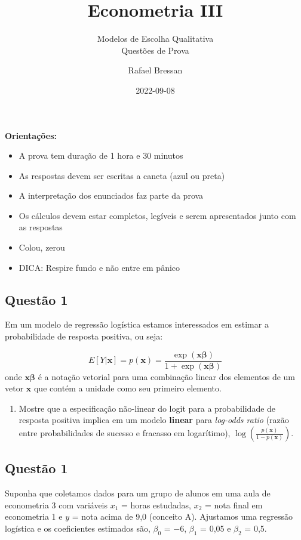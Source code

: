 \documentclass[
]{article}
\title{Econometria III}
\subtitle{Modelos de Escolha Qualitativa\\
Questões de Prova}
\author{Rafael Bressan}
\date{2022-09-08}
\providecommand{\tightlist}{%
  \setlength{\itemsep}{0pt}\setlength{\parskip}{0pt}}
\begin{document}
\maketitle

\textbf{Orientações:}

\begin{itemize}
\tightlist
\item
  A prova tem duração de 1 hora e 30 minutos
\item
  As respostas devem ser escritas a caneta (azul ou preta)
\item
  A interpretação dos enunciados faz parte da prova
\item
  Os cálculos devem estar completos, legíveis e serem apresentados junto
  com as respostas
\item
  Colou, zerou
\item
  DICA: Respire fundo e não entre em pânico
\end{itemize}

\hypertarget{questuxe3o-1}{%
\subsection{Questão 1}\label{questuxe3o-1}}

Em um modelo de regressão logística estamos interessados em estimar a
probabilidade de resposta positiva, ou seja:

\[E[Y|\symbf{x}]=p(\symbf{x})=\frac{\exp(\symbf{x\beta})}{1+\exp(\symbf{x\beta})}\]
onde \(\symbf{x\beta}\) é a notação vetorial para uma combinação linear
dos elementos de um vetor \(\symbf{x}\) que contém a unidade como seu
primeiro elemento.

\begin{enumerate}
\def\labelenumi{\alph{enumi})}
\tightlist
\item
  Mostre que a especificação não-linear do logit para a probabilidade de
  resposta positiva implica em um modelo \textbf{linear} para
  \emph{log-odds ratio} (razão entre probabilidades de sucesso e
  fracasso em logarítimo),
  \(\log\left(\frac{p(\symbf{x})}{1-p(\symbf{x})}\right)\).
\end{enumerate}

\hypertarget{questuxe3o-1-1}{%
\subsection{Questão 1}\label{questuxe3o-1-1}}

Suponha que coletamos dados para um grupo de alunos em uma aula de
econometria 3 com variáveis \(x_1\) = horas estudadas, \(x_2\) = nota
final em econometria 1 e \(y\) = nota acima de 9,0 (conceito A).
Ajustamos uma regressão logística e os coeficientes estimados são,
\(\beta_0\) = −6, \(\beta_1\) = 0,05 e \(\beta_2\) = 0,5.
\end{document}
